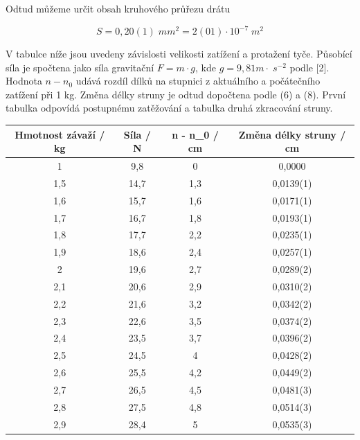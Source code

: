 Odtud můžeme určit obsah kruhového průřezu drátu

\begin{equation}
    \nonumber
    S = 0,20(1) \; mm^2 = 2(01) \cdot 10^{-7} \; m^2
\end{equation}

V tabulce níže jsou uvedeny závislosti velikosti zatížení a protažení tyče. Působící síla je spočtena jako síla gravitační \(F = m \cdot g\), kde \(g = 9,81 m \cdot \; s^{-2}\) podle [2]. Hodnota \(n - n_0\) udává rozdíl dílků na stupnici z aktuálního a počátečního zatížení při 1 kg. Změna délky struny je odtud dopočtena podle (6) a (8). První tabulka odpovídá postupnému zatěžování a tabulka druhá zkracování struny.

\begin{table}[h]
\centering
\begin{tabular}{|c|c|c|c|}
\hline
Hmotnost závaží / kg & Síla / N & n - n\_0 / cm & Změna délky struny / cm \\ \hline
1                    & 9,8      & 0             & 0,0000                  \\ \hline
1,5                  & 14,7     & 1,3           & 0,0139(1)                  \\ \hline
1,6                  & 15,7     & 1,6           & 0,0171(1)                  \\ \hline
1,7                  & 16,7     & 1,8           & 0,0193(1)                  \\ \hline
1,8                  & 17,7     & 2,2           & 0,0235(1)                  \\ \hline
1,9                  & 18,6     & 2,4           & 0,0257(1)                  \\ \hline
2                    & 19,6     & 2,7           & 0,0289(2)                  \\ \hline
2,1                  & 20,6     & 2,9           & 0,0310(2)                  \\ \hline
2,2                  & 21,6     & 3,2           & 0,0342(2)                  \\ \hline
2,3                  & 22,6     & 3,5           & 0,0374(2)                  \\ \hline
2,4                  & 23,5     & 3,7           & 0,0396(2)                  \\ \hline
2,5                  & 24,5     & 4             & 0,0428(2)                  \\ \hline
2,6                  & 25,5     & 4,2           & 0,0449(2)                  \\ \hline
2,7                  & 26,5     & 4,5           & 0,0481(3)                  \\ \hline
2,8                  & 27,5     & 4,8           & 0,0514(3)                  \\ \hline
2,9                  & 28,4     & 5             & 0,0535(3)                  \\ \hline
\end{tabular}
\end{table}

